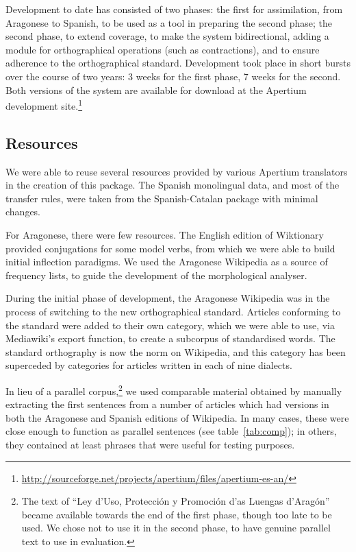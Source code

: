 \documentclass[10pt, a4paper]{article}
\begin{document}
  Development to date has consisted of two phases: the first for assimilation, from Aragonese to Spanish, to be used as a tool in preparing the second phase; the second phase, to extend coverage, to make the system bidirectional, adding a module for orthographical operations (such as contractions), and to ensure adherence to the orthographical standard. Development took place in short bursts over the course of two years: 3 weeks for the first phase, 7 weeks for the second. Both versions of the system are available for download at the Apertium development site.\footnote{\url{http://sourceforge.net/projects/apertium/files/apertium-es-an/}}

  \subsection{Resources}
  
  We were able to reuse several resources provided by various Apertium translators in the creation of this package. The Spanish monolingual data, and most of the transfer rules, were taken from the Spanish-Catalan package with minimal changes. 
  
  For Aragonese, there were few resources. The English edition of Wiktionary provided conjugations for some model verbs, from which we were able to build initial inflection paradigms. We used the Aragonese Wikipedia as a source of frequency lists, to guide the development of the morphological analyser.
  
  During the initial phase of development, the Aragonese Wikipedia was in the process of switching to the new orthographical standard. Articles conforming to the standard were added to their own category, which we were able to use, via Mediawiki's export function, to create a subcorpus of standardised words. The standard orthography is now the norm on Wikipedia, and this category has been superceded by categories for articles written in each of nine dialects.
  
  In lieu of a parallel corpus,\footnote{The text of ``Ley d'Uso, Protección y Promoción d'as Luengas d'Aragón'' became available towards the end of the first phase, though too late to be used. We chose not to use it in the second phase, to have genuine parallel text to use in evaluation.} we used comparable material obtained by manually extracting the first sentences from a number of articles which had versions in both the Aragonese and Spanish editions of Wikipedia. In many cases, these were close enough to function as parallel sentences (see table~\ref{tab:comp}); in others, they contained at least phrases that were useful for testing purposes.
\end{document}

